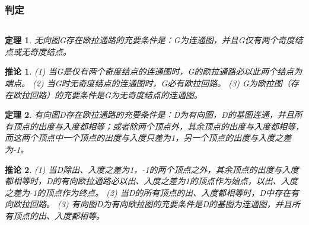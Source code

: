 \documentclass[a4]{article}
\begin{document}
\subsubsection{判定}
\begin{lstlisting}
\end{lstlisting}
\newtheorem{theorem}{定理}
\begin{theorem}
无向图G存在欧拉通路的充要条件是：G为连通图，并且G仅有两个奇度结点或无奇度结点。
\end{theorem}
\newtheorem{corollary}{推论}
\begin{corollary}

(1) 当G是仅有两个奇度结点的连通图时，G的欧拉通路必以此两个结点为端点。
(2) 当G时无奇度结点的连通图时，G必有欧拉回路。
(3) G为欧拉图（存在欧拉回路）的充要条件是G为无奇度结点的连通图。
\end{corollary}
\begin{theorem}
有向图D存在欧拉通路的充要条件是：D为有向图，D的基图连通，并且所有顶点的出度与入度都相等；或者除两个顶点外，其余顶点的出度与入度都相等，而这两个顶点中一个顶点的出度与入度只差为1，另一个顶点的出度与入度之差为-1。
\end{theorem}
\begin{corollary}

(1) 当D除出、入度之差为1，-1的两个顶点之外，其余顶点的出度与入度都相等时，D的有向欧拉通路必以出、入度之差为1的顶点作为始点，以出、入度之差为-1的顶点作为终点。
(2) 当D的所有顶点的出、入度都相等时，D中存在有向欧拉回路。
(3) 有向图D为有向欧拉图的充要条件是D的基图为连通图，并且所有顶点的出、入度都相等。
\end{corollary}
\begin{lstlisting}
\end{lstlisting}
\end{document}
